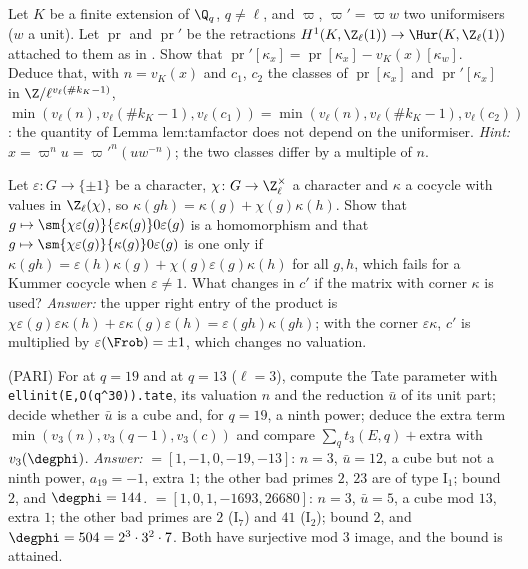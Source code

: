 \begin{exercise}\label{ex:galcoh:ex-uniformiser}
Let $K$ be a finite extension of $\Q_q$, $q\ne\ell$, and $\varpi$, $\varpi'=\varpi w$ two uniformisers ($w$ a unit). Let $\operatorname{pr}$ and $\operatorname{pr}'$ be the retractions
$H^1(K,\Z_\ell(1))\to\Hur(K,\Z_\ell(1))$ attached to them as in . Show that $\operatorname{pr}'[\kappa_x]=\operatorname{pr}[\kappa_x]-v_K(x)[\kappa_w]$.
Deduce that, with $n=v_K(x)$ and $c_1$, $c_2$ the classes of $\operatorname{pr}[\kappa_x]$ and $\operatorname{pr}'[\kappa_x]$ in $\Z/\ell^{v_\ell(\#k_K-1)}$,
$\min(v_\ell(n),v_\ell(\#k_K-1),v_\ell(c_1))=\min(v_\ell(n),v_\ell(\#k_K-1),v_\ell(c_2))$: the quantity of Lemma lem:tamfactor does not depend on the uniformiser. \emph{Hint:} $x=\varpi^nu=\varpi'^n(uw^{-n})$; the two classes differ by a multiple of $n$.
\end{exercise}

\begin{exercise}\label{ex:galcoh:ex-corner}
Let $\varepsilon\colon G\to\{\pm1\}$ be a character, $\chi\colon G\to\Z_\ell^\times$ a character and $\kappa$ a cocycle with values in $\Z_\ell(\chi)$, so $\kappa(gh)=\kappa(g)+\chi(g)\kappa(h)$.
Show that $g\mapsto\sm{\chi\varepsilon(g)}{\varepsilon\kappa(g)}0{\varepsilon(g)}$ is a homomorphism and that $g\mapsto\sm{\chi\varepsilon(g)}{\kappa(g)}0{\varepsilon(g)}$ is one only if $\kappa(gh)=\varepsilon(h)\kappa(g)+\chi(g)\varepsilon(g)\kappa(h)$
for all $g,h$, which fails for a Kummer cocycle when $\varepsilon\ne1$. What changes in $c'$ if the matrix with corner $\kappa$ is used? \emph{Answer:} the upper right entry of the
product is $\chi\varepsilon(g)\varepsilon\kappa(h)+\varepsilon\kappa(g)\varepsilon(h)=\varepsilon(gh)\kappa(gh)$; with the corner $\varepsilon\kappa$, $c'$ is multiplied by $\varepsilon(\Frob)=\pm1$, which changes no valuation.
\end{exercise}

\begin{exercise}\label{ex:galcoh:ex-pari-tate}
(PARI) For  at $q=19$ and  at $q=13$ ($\ell=3$), compute the Tate parameter with \texttt{ellinit(E,O(q\^{}30)).tate}, its valuation $n$ and the reduction
$\bar u$ of its unit part; decide whether $\bar u$ is a cube and, for $q=19$, a ninth power; deduce the extra term $\min(v_3(n),v_3(q-1),v_3(c))$ and compare
$\sum_qt_3(E,q)+\text{extra}$ with $v_3(\degphi)$. \emph{Answer:}  $=[1,-1,0,-19,-13]$: $n=3$, $\bar u=12$, a cube but not a ninth power, $a_{19}=-1$, extra $1$; the
other bad primes $2$, $23$ are of type $\mathrm I_1$; bound $2$, and $\degphi=144$.  $=[1,0,1,-1693,26680]$: $n=3$, $\bar u=5$, a cube mod $13$, extra $1$; the
other bad primes are $2$ ($\mathrm I_7$) and $41$ ($\mathrm I_2$); bound $2$, and $\degphi=504=2^3\cdot3^2\cdot7$. Both have surjective mod $3$ image, and the bound is attained.
\end{exercise}

